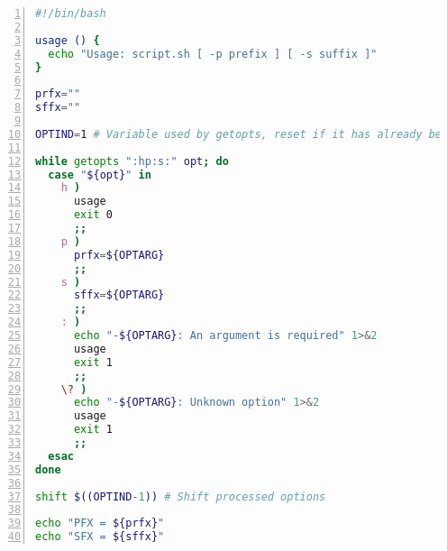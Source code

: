 \documentclass[a4paper,12pt,%
              final%
              ]{article}
\begin{document}
\appendix
\begin{lstlisting}[language=bash,numbers=left,float,frame=single,caption={script.sh, an example for \texttt{getopts}},label={lst:getopt_ex},numberfirstline=true,stepnumber=5,firstnumber=1]
#!/bin/bash

usage () {
  echo "Usage: script.sh [ -p prefix ] [ -s suffix ]"
}

prfx=""
sffx=""

OPTIND=1 # Variable used by getopts, reset if it has already been used

while getopts ":hp:s:" opt; do
  case "${opt}" in
    h )
      usage
      exit 0
      ;;
    p )
      prfx=${OPTARG}
      ;;
    s )
      sffx=${OPTARG}
      ;;
    : )
      echo "-${OPTARG}: An argument is required" 1>&2
      usage
      exit 1
      ;;
    \? )
      echo "-${OPTARG}: Unknown option" 1>&2
      usage
      exit 1
      ;;
  esac
done

shift $((OPTIND-1)) # Shift processed options

echo "PFX = ${prfx}"
echo "SFX = ${sffx}"
\end{lstlisting}
\end{document}
